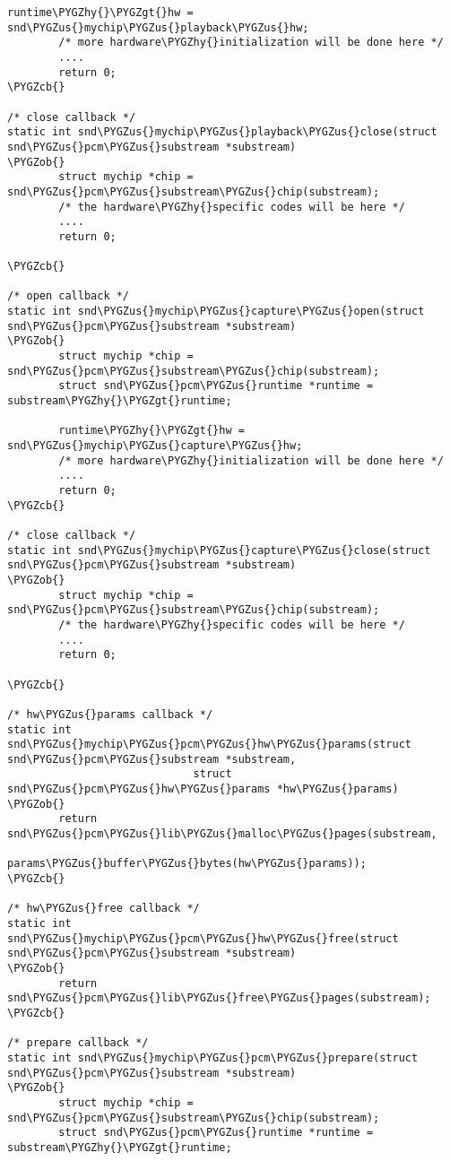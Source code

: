 \documentclass[a4paper,8pt,english]{sphinxmanual}
\def\PYGZus{\char`\_}
\def\PYGZob{\char`\{}
\def\PYGZcb{\char`\}}
\def\PYGZgt{\char`\>}
\def\PYGZhy{\char`\-}
\begin{document}
\begin{Verbatim}[commandchars=\\\{\}]
        runtime\PYGZhy{}\PYGZgt{}hw = snd\PYGZus{}mychip\PYGZus{}playback\PYGZus{}hw;
        /* more hardware\PYGZhy{}initialization will be done here */
        ....
        return 0;
\PYGZcb{}

/* close callback */
static int snd\PYGZus{}mychip\PYGZus{}playback\PYGZus{}close(struct snd\PYGZus{}pcm\PYGZus{}substream *substream)
\PYGZob{}
        struct mychip *chip = snd\PYGZus{}pcm\PYGZus{}substream\PYGZus{}chip(substream);
        /* the hardware\PYGZhy{}specific codes will be here */
        ....
        return 0;

\PYGZcb{}

/* open callback */
static int snd\PYGZus{}mychip\PYGZus{}capture\PYGZus{}open(struct snd\PYGZus{}pcm\PYGZus{}substream *substream)
\PYGZob{}
        struct mychip *chip = snd\PYGZus{}pcm\PYGZus{}substream\PYGZus{}chip(substream);
        struct snd\PYGZus{}pcm\PYGZus{}runtime *runtime = substream\PYGZhy{}\PYGZgt{}runtime;

        runtime\PYGZhy{}\PYGZgt{}hw = snd\PYGZus{}mychip\PYGZus{}capture\PYGZus{}hw;
        /* more hardware\PYGZhy{}initialization will be done here */
        ....
        return 0;
\PYGZcb{}

/* close callback */
static int snd\PYGZus{}mychip\PYGZus{}capture\PYGZus{}close(struct snd\PYGZus{}pcm\PYGZus{}substream *substream)
\PYGZob{}
        struct mychip *chip = snd\PYGZus{}pcm\PYGZus{}substream\PYGZus{}chip(substream);
        /* the hardware\PYGZhy{}specific codes will be here */
        ....
        return 0;

\PYGZcb{}

/* hw\PYGZus{}params callback */
static int snd\PYGZus{}mychip\PYGZus{}pcm\PYGZus{}hw\PYGZus{}params(struct snd\PYGZus{}pcm\PYGZus{}substream *substream,
                             struct snd\PYGZus{}pcm\PYGZus{}hw\PYGZus{}params *hw\PYGZus{}params)
\PYGZob{}
        return snd\PYGZus{}pcm\PYGZus{}lib\PYGZus{}malloc\PYGZus{}pages(substream,
                                   params\PYGZus{}buffer\PYGZus{}bytes(hw\PYGZus{}params));
\PYGZcb{}

/* hw\PYGZus{}free callback */
static int snd\PYGZus{}mychip\PYGZus{}pcm\PYGZus{}hw\PYGZus{}free(struct snd\PYGZus{}pcm\PYGZus{}substream *substream)
\PYGZob{}
        return snd\PYGZus{}pcm\PYGZus{}lib\PYGZus{}free\PYGZus{}pages(substream);
\PYGZcb{}

/* prepare callback */
static int snd\PYGZus{}mychip\PYGZus{}pcm\PYGZus{}prepare(struct snd\PYGZus{}pcm\PYGZus{}substream *substream)
\PYGZob{}
        struct mychip *chip = snd\PYGZus{}pcm\PYGZus{}substream\PYGZus{}chip(substream);
        struct snd\PYGZus{}pcm\PYGZus{}runtime *runtime = substream\PYGZhy{}\PYGZgt{}runtime;


\end{Verbatim}
\end{document}
